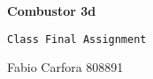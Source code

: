 \begin{center}
	{\Huge \textbf{Combustor 3d}}
\end{center}

\begin{center}	
	{\Large \verb!Class Final Assignment!} 
\end{center}

\smallskip
\begin{center}
	{\large \textrm{Fabio Carfora 808891}} 
\end{center}

\medskip

